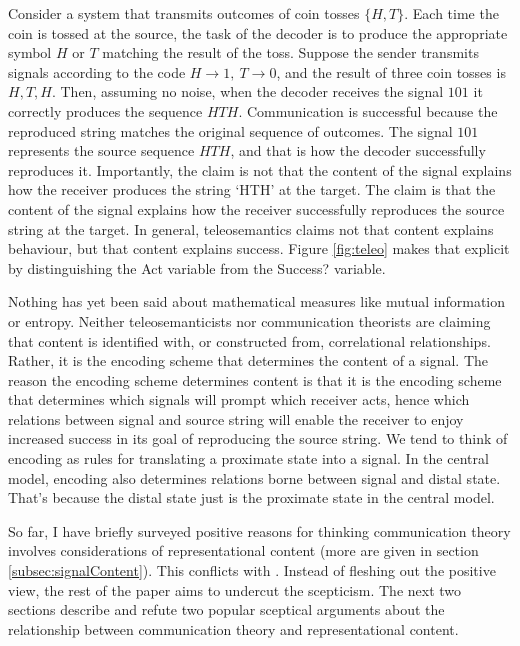 \documentclass[12pt]{article}
\begin{document}
Consider a system that transmits outcomes of coin tosses $\{H,T\}$.
Each time the coin is tossed at the source, the task of the decoder is to produce the appropriate symbol $H$ or $T$ matching the result of the toss.
Suppose the sender transmits signals according to the code $H\rightarrow1,\ T\rightarrow0$, and the result of three coin tosses is $H, T, H$.
Then, assuming no noise, when the decoder receives the signal $101$ it correctly produces the sequence $HTH$.
Communication is successful because the reproduced string matches the original sequence of outcomes.
The signal $101$ represents the source sequence $HTH$, and that is how the decoder successfully reproduces it.
Importantly, the claim is not that the content of the signal explains how the receiver produces the string `HTH' at the target.
The claim is that the content of the signal explains how the receiver successfully reproduces the source string at the target.
In general, teleosemantics claims not that content explains behaviour, but that content explains success.
Figure \ref{fig:teleo} makes that explicit by distinguishing the Act variable from the Success? variable.

Nothing has yet been said about mathematical measures like mutual information or entropy.
Neither teleosemanticists nor communication theorists are claiming that content is identified with, or constructed from, correlational relationships.
Rather, it is the encoding scheme that determines the content of a signal.
The reason the encoding scheme determines content is that it is the encoding scheme that determines which signals will prompt which receiver acts, hence which relations between signal and source string will enable the receiver to enjoy increased success in its goal of reproducing the source string.
We tend to think of encoding as rules for translating a proximate state into a signal.
In the central model, encoding also determines relations borne between signal and distal state.
That's because the distal state just is the proximate state in the central model.

So far, I have briefly surveyed positive reasons for thinking communication theory involves considerations of representational content (more are given in section \ref{subsec:signalContent}).
This conflicts with \tic{}.
Instead of fleshing out the positive view, the rest of the paper aims to undercut the scepticism.
The next two sections describe and refute two popular sceptical arguments about the relationship between communication theory and representational content.
\end{document}
